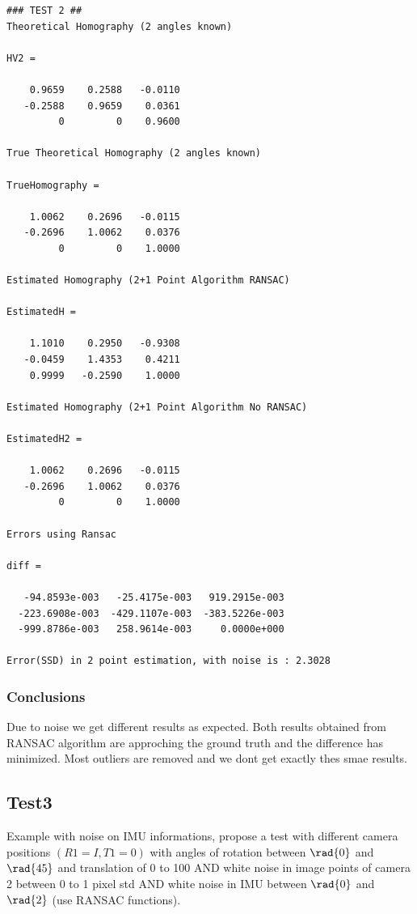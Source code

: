\documentclass[a4paper,12pt]{article}
\begin{document}
\begin{verbatim}
### TEST 2 ##
Theoretical Homography (2 angles known)

HV2 =

    0.9659    0.2588   -0.0110
   -0.2588    0.9659    0.0361
         0         0    0.9600

True Theoretical Homography (2 angles known)

TrueHomography =

    1.0062    0.2696   -0.0115
   -0.2696    1.0062    0.0376
         0         0    1.0000

Estimated Homography (2+1 Point Algorithm RANSAC)

EstimatedH =

    1.1010    0.2950   -0.9308
   -0.0459    1.4353    0.4211
    0.9999   -0.2590    1.0000

Estimated Homography (2+1 Point Algorithm No RANSAC)

EstimatedH2 =

    1.0062    0.2696   -0.0115
   -0.2696    1.0062    0.0376
         0         0    1.0000

Errors using Ransac

diff =

   -94.8593e-003   -25.4175e-003   919.2915e-003
  -223.6908e-003  -429.1107e-003  -383.5226e-003
  -999.8786e-003   258.9614e-003     0.0000e+000

Error(SSD) in 2 point estimation, with noise is : 2.3028
\end{verbatim}

\subsubsection{Conclusions}
Due to noise we get different results as expected. Both results obtained from RANSAC algorithm are 
approching the ground truth and the difference has minimized. Most outliers are removed and we dont get exactly thes smae results.


\subsection{Test3}
Example with noise on IMU informations, propose a test with different camera positions $(R1 =
I, T1 = 0)$ with angles of rotation between $\rad{0}$ and $\rad{45}$ and translation of 0 to
100 AND white noise in image points of camera 2 between 0 to 1 pixel std AND white noise in IMU between $\rad{0}$ and $\rad{2}$ (use
RANSAC functions).
\end{document}
